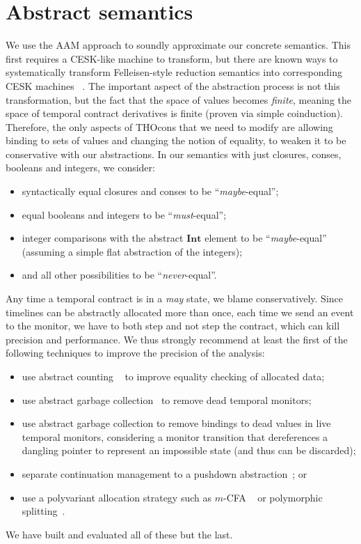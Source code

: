 \section{Abstract semantics}

We use the AAM approach to soundly approximate our concrete semantics.
%
This first requires a CESK-like machine to transform, but there are known ways to systematically transform Felleisen-style reduction semantics into corresponding CESK machines ~\citep{dvanhorn:Danvy-Nielsen:RS-04-26}.
%
The important aspect of the abstraction process is not this transformation, but the fact that the space of values becomes \emph{finite}, meaning the space of temporal contract derivatives is finite (proven via simple coinduction).
%
Therefore, the only aspects of THOcons that we need to modify are allowing binding to sets of values and changing the notion of equality, to weaken it to be conservative with our abstractions.
%
In our semantics with just closures, conses, booleans and integers, we consider:
\begin{itemize}
 \item syntactically equal closures and conses to be ``\emph{maybe}-equal'';
 \item equal booleans and integers to be ``\emph{must}-equal'';
 \item integer comparisons with the abstract $\mathbf{Int}$ element to be ``\emph{maybe}-equal'' (assuming a simple flat abstraction of the integers);
 \item and all other possibilities to be ``\emph{never}-equal''.
\end{itemize}
%
Any time a temporal contract is in a \emph{may} state, we blame conservatively.
%
Since timelines can be abstractly allocated more than once, each time we send an event to the monitor, we have to both step and not step the contract, which can kill precision and performance.
%
We thus strongly recommend at least the first of the following techniques to improve the precision of the analysis:
\begin{itemize}
\item{use abstract counting ~\citep{dvanhorn:Might:2006:GammaCFA} to improve equality checking of allocated data;}
\item{use abstract garbage collection~\citep{dvanhorn:Might:2006:GammaCFA} to remove dead temporal monitors;}
\item{use abstract garbage collection to remove bindings to dead values in live temporal monitors, considering a monitor transition that dereferences a dangling pointer to represent an impossible state (and thus can be discarded);}
\item{separate continuation management to a pushdown abstraction~\citep{dvanhorn:Vardoulakis2011CFA2}; or}
\item{use a polyvariant allocation strategy such as $m$-CFA ~\citep{dvanhorn:Might2010Resolving} or polymorphic splitting~\citep{dvanhorn:wright-jagannathan-toplas98}.}
\end{itemize}
%
We have built and evaluated all of these but the last.

